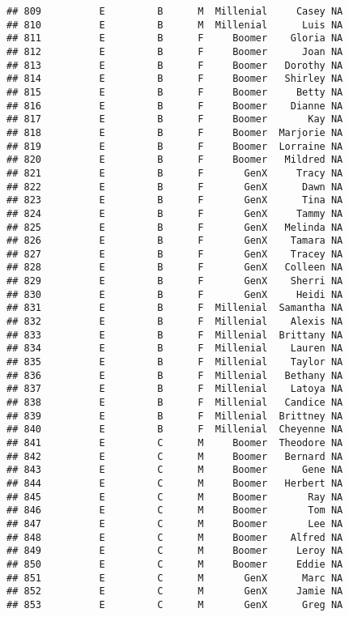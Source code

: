 \documentclass[
]{article}
\begin{document}
\begin{verbatim}
## 809          E         B      M  Millenial     Casey NA
## 810          E         B      M  Millenial      Luis NA
## 811          E         B      F     Boomer    Gloria NA
## 812          E         B      F     Boomer      Joan NA
## 813          E         B      F     Boomer   Dorothy NA
## 814          E         B      F     Boomer   Shirley NA
## 815          E         B      F     Boomer     Betty NA
## 816          E         B      F     Boomer    Dianne NA
## 817          E         B      F     Boomer       Kay NA
## 818          E         B      F     Boomer  Marjorie NA
## 819          E         B      F     Boomer  Lorraine NA
## 820          E         B      F     Boomer   Mildred NA
## 821          E         B      F       GenX     Tracy NA
## 822          E         B      F       GenX      Dawn NA
## 823          E         B      F       GenX      Tina NA
## 824          E         B      F       GenX     Tammy NA
## 825          E         B      F       GenX   Melinda NA
## 826          E         B      F       GenX    Tamara NA
## 827          E         B      F       GenX    Tracey NA
## 828          E         B      F       GenX   Colleen NA
## 829          E         B      F       GenX    Sherri NA
## 830          E         B      F       GenX     Heidi NA
## 831          E         B      F  Millenial  Samantha NA
## 832          E         B      F  Millenial    Alexis NA
## 833          E         B      F  Millenial  Brittany NA
## 834          E         B      F  Millenial    Lauren NA
## 835          E         B      F  Millenial    Taylor NA
## 836          E         B      F  Millenial   Bethany NA
## 837          E         B      F  Millenial    Latoya NA
## 838          E         B      F  Millenial   Candice NA
## 839          E         B      F  Millenial  Brittney NA
## 840          E         B      F  Millenial  Cheyenne NA
## 841          E         C      M     Boomer  Theodore NA
## 842          E         C      M     Boomer   Bernard NA
## 843          E         C      M     Boomer      Gene NA
## 844          E         C      M     Boomer   Herbert NA
## 845          E         C      M     Boomer       Ray NA
## 846          E         C      M     Boomer       Tom NA
## 847          E         C      M     Boomer       Lee NA
## 848          E         C      M     Boomer    Alfred NA
## 849          E         C      M     Boomer     Leroy NA
## 850          E         C      M     Boomer     Eddie NA
## 851          E         C      M       GenX      Marc NA
## 852          E         C      M       GenX     Jamie NA
## 853          E         C      M       GenX      Greg NA

\end{verbatim}
\end{document}
